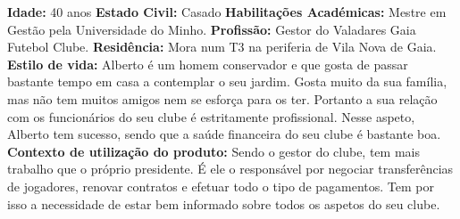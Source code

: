 \noindent\textbf{Idade:} 40 anos
\newline\textbf{Estado Civil:} Casado
\newline\textbf{Habilitações Académicas:} Mestre em Gestão pela Universidade do Minho.
\newline\textbf{Profissão:} Gestor do Valadares Gaia Futebol Clube.
\newline\textbf{Residência:} Mora num T3 na periferia de Vila Nova de Gaia.
\vspace{3mm}
\newline\textbf{Estilo de vida:} Alberto é um homem conservador e que gosta de passar bastante tempo em casa a contemplar o seu jardim. Gosta muito da sua família, mas não tem muitos amigos nem se esforça para os ter. Portanto a sua relação com os funcionários do seu clube é estritamente profissional. Nesse aspeto, Alberto tem sucesso, sendo que a saúde financeira do seu clube é bastante boa.
\vspace{3mm}
\newline\textbf{Contexto de utilização do produto:} Sendo o gestor do clube, tem mais trabalho que o próprio presidente. É ele o responsável por negociar transferências de jogadores, renovar contratos e efetuar todo o tipo de pagamentos. Tem por isso a necessidade de estar bem informado sobre todos os aspetos do seu clube. 

\vspace{3mm}

